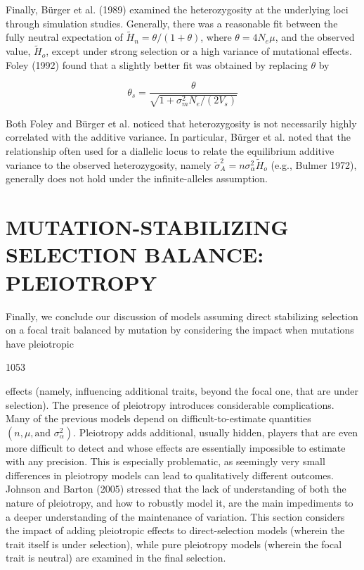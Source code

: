 \documentclass{article}
\begin{document}
Finally, Bürger et al. (1989) examined the heterozygosity at the underlying loci through simulation studies. Generally, there was a reasonable fit between the fully neutral expectation of  $ \widetilde{H}_n = \theta/(1 + \theta) $, where  $ \theta = 4N_e\mu $, and the observed value,  $ \widetilde{H}_o $, except under strong selection or a high variance of mutational effects. Foley (1992) found that a slightly better fit was obtained by replacing  $ \theta $ by

\begin{equation}
\theta_{s}=\frac{\theta}{\sqrt{1+\sigma_{m}^{2}N_{e}/(2V_{s})}}
\tag{28.34c}
\label{eq:28_34c}
\end{equation}

Both Foley and Bürger et al. noticed that heterozygosity is not necessarily highly correlated with the additive variance. In particular, Bürger et al. noted that the relationship often used for a diallelic locus to relate the equilibrium additive variance to the observed heterozygosity, namely  $ \widetilde{\sigma}_A^2 = n\sigma_\alpha^2 \widetilde{H}_o $ (e.g., Bulmer 1972), generally does not hold under the infinite-alleles assumption.

\section{MUTATION-STABILIZING SELECTION BALANCE: PLEIOTROPY}
Finally, we conclude our discussion of models assuming direct stabilizing selection on a focal trait balanced by mutation by considering the impact when mutations have pleiotropic

1053

effects (namely, influencing additional traits, beyond the focal one, that are under selection). The presence of pleiotropy introduces considerable complications. Many of the previous models depend on difficult-to-estimate quantities  $ (n, \mu, \text{and } \sigma_{\alpha}^{2}) $. Pleiotropy adds additional, usually hidden, players that are even more difficult to detect and whose effects are essentially impossible to estimate with any precision. This is especially problematic, as seemingly very small differences in pleiotropy models can lead to qualitatively different outcomes. Johnson and Barton (2005) stressed that the lack of understanding of both the nature of pleiotropy, and how to robustly model it, are the main impediments to a deeper understanding of the maintenance of variation. This section considers the impact of adding pleiotropic effects to direct-selection models (wherein the trait itself is under selection), while pure pleiotropy models (wherein the focal trait is neutral) are examined in the final selection.
\end{document}

